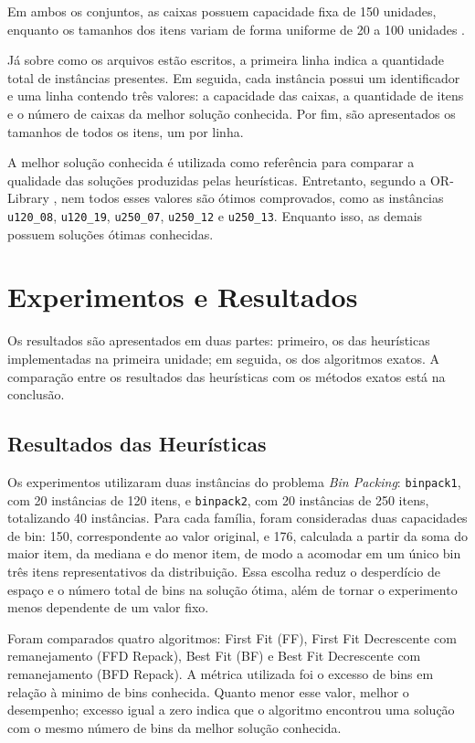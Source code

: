 \documentclass[12pt]{article}
\begin{document}
Em ambos os conjuntos, as caixas possuem capacidade fixa de 150 unidades, enquanto os tamanhos dos itens variam de forma uniforme de 20 a 100 unidades \cite{orlibrary}. 

Já sobre como os arquivos estão escritos, a primeira linha indica a quantidade total de instâncias presentes. Em seguida, cada instância possui um identificador e uma linha contendo três valores: a capacidade das caixas, a quantidade de itens e o número de caixas da melhor solução conhecida. Por fim, são apresentados os tamanhos de todos os itens, um por linha.

A melhor solução conhecida é utilizada como referência para comparar a qualidade das soluções produzidas pelas heurísticas. Entretanto, segundo a OR-Library \cite{orlibrary}, nem todos esses valores são ótimos comprovados, como as instâncias \texttt{u120\_08}, \texttt{u120\_19}, \texttt{u250\_07}, \texttt{u250\_12} e \texttt{u250\_13}. Enquanto isso, as demais possuem soluções ótimas conhecidas.

\section{Experimentos e Resultados}

Os resultados são apresentados em duas partes: primeiro, os das heurísticas implementadas na primeira unidade; em seguida, os dos algoritmos exatos. A comparação entre os resultados das heurísticas com os métodos exatos está na conclusão.

\subsection{Resultados das Heurísticas}

Os experimentos utilizaram duas instâncias do problema
\textit{Bin Packing}: \texttt{binpack1}, com 20 instâncias de 120 itens,
e \texttt{binpack2}, com 20 instâncias de 250 itens, totalizando
40 instâncias. Para cada família, foram consideradas duas capacidades
de bin: 150, correspondente ao valor original, e 176, calculada a
partir da soma do maior item, da mediana e do menor item, de modo a
acomodar em um único bin três itens representativos da distribuição.
Essa escolha reduz o desperdício de espaço e o número total de bins na
solução ótima, além de tornar o experimento menos dependente de um
valor fixo.

Foram comparados quatro algoritmos: First Fit (FF), First Fit
Decrescente com remanejamento (FFD Repack), Best Fit (BF) e Best Fit
Decrescente com remanejamento (BFD Repack). A métrica utilizada foi o
excesso de bins em relação à minimo de bins conhecida. Quanto menor
esse valor, melhor o desempenho; excesso igual a zero indica que o
algoritmo encontrou uma solução com o mesmo número de bins da melhor
solução conhecida.
\end{document}

